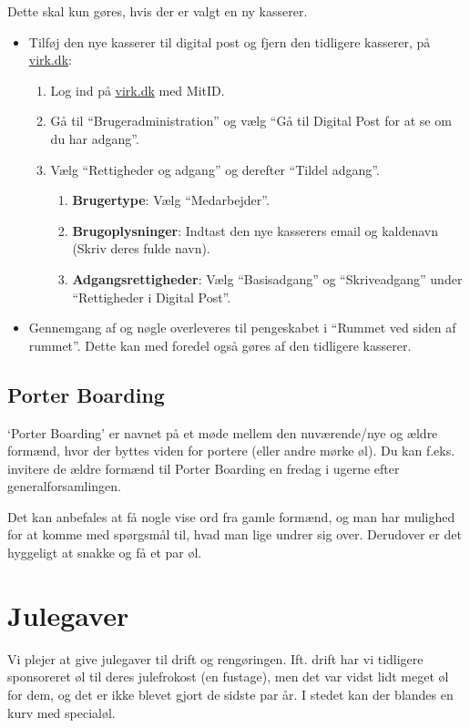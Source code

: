 Dette skal kun gøres, hvis der er valgt en ny kasserer.
\begin{itemize}
    \item Tilføj den nye kasserer til digital post og fjern den tidligere kasserer, på \url{virk.dk}:
    \begin{enumerate}
        \item Log ind på \url{virk.dk} med MitID.
        \item Gå til ``Brugeradministration'' og vælg ``Gå til Digital Post for at se om du har adgang''.
        \item Vælg ``Rettigheder og adgang'' og derefter ``Tildel adgang''.
        \begin{enumerate}
            \item \textbf{Brugertype}: Vælg ``Medarbejder''.
            \item \textbf{Brugoplysninger}: Indtast den nye kasserers email og kaldenavn (Skriv deres fulde navn).
            \item \textbf{Adgangsrettigheder}: Vælg ``Basisadgang'' og ``Skriveadgang'' under ``Rettigheder i Digital Post''.
        \end{enumerate}
    \end{enumerate}
    \item Gennemgang af og nøgle overleveres til pengeskabet i ``Rummet ved siden af rummet''. 
    Dette kan med foredel også gøres af den tidligere kasserer.
\end{itemize}

\subsection{Porter Boarding}
\label{sec:porter-boarding}

`Porter Boarding' er navnet på et møde mellem den nuværende/nye
og ældre formænd, hvor der byttes viden for portere (eller andre mørke øl).
Du kan f.eks. invitere de ældre formænd til Porter Boarding en fredag i ugerne efter
generalforsamlingen.

Det kan anbefales at få nogle vise ord fra gamle formænd, og man har
mulighed for at komme med spørgsmål til, hvad man lige undrer sig
over. Derudover er det hyggeligt at snakke og få et par øl.

\section{Julegaver}
\label{sec:julegaver}

Vi plejer at give julegaver til drift og
rengøringen. Ift. drift har vi tidligere sponsoreret øl til deres
julefrokost (en fustage), men det var vidst lidt meget øl for dem, og
det er ikke blevet gjort de sidste par år. I stedet kan der blandes en
kurv med specialøl.

